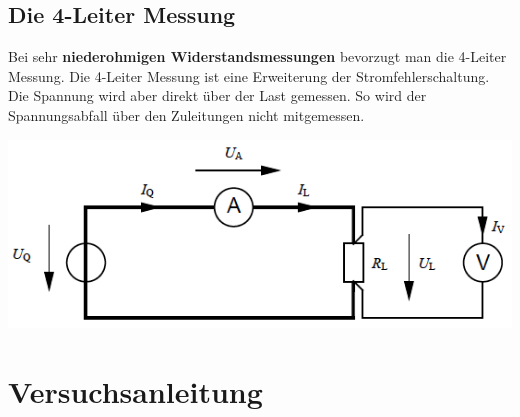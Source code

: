 \subsection{Die 4-Leiter Messung}
Bei sehr \textbf{niederohmigen Widerstandsmessungen} bevorzugt man die 4-Leiter Messung. Die 4-Leiter Messung ist eine Erweiterung der Stromfehlerschaltung. Die Spannung wird aber direkt über der Last gemessen. So wird der Spannungsabfall über den Zuleitungen nicht mitgemessen.
\begin{center}
\includegraphics[scale=0.8]{../img/II/IIe}
\end{center}
\section{Versuchsanleitung}
